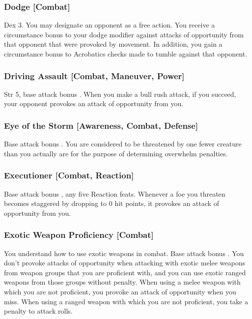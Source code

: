\subsubsection{Dodge [Combat]}
 Dex 3.
 You may designate an opponent as a free action. You receive a  circumstance bonus to your dodge modifier against attacks of opportunity from that opponent that were provoked by movement. In addition, you gain a  circumstance bonus to Acrobatics checks made to tumble against that opponent.

\subsubsection{Driving Assault [Combat, Maneuver, Power]}
\featpre Str 5, base attack bonus .
\featben When you make a bull rush attack, if you succeed, your opponent provokes an attack of opportunity from you.

\subsubsection{Eye of the Storm [Awareness, Combat, Defense]}
 Base attack bonus .
 You are considered to be threatened by one fewer creature than you actually are for the purpose of determining overwhelm penalties.

\subsubsection{Executioner [Combat, Reaction]}
 Base attack bonus , any five Reaction feats.
 Whenever a foe you threaten becomes staggered by dropping to 0 hit points, it provokes an attack of opportunity from you.

\subsubsection{Exotic Weapon Proficiency [Combat]}
You understand how to use exotic weapons in combat.
 Base attack bonus .
 You don't provoke attacks of opportunity when attacking with exotic melee weapons from weapon groups that you are proficient with, and you can use exotic ranged weapons from those groups without penalty.
 When using a melee weapon with which you are not proficient, you provoke an attack of opportunity when you miss. When using a ranged weapon with which you are not proficient, you take a  penalty to attack rolls.

